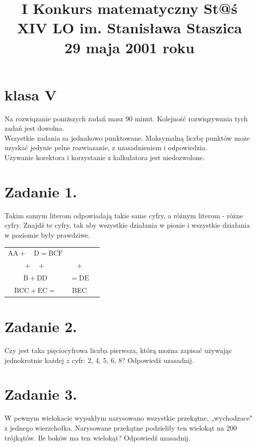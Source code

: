 \documentclass[10pt]{article}
\title{I Konkurs matematyczny St@ś \\
 XIV LO im. Stanisława Staszica \\
 29 maja 2001 roku }
\author{}
\date{}
\begin{document}
\maketitle
\section*{klasa V}
Na rozwiqzanie poniższych zadań masz 90 minut. Kolejność rozwiqzywania tych zadań jest dowolna.\\
Wszystkie zadania sa jednakowo punktowane. Maksymalną liczbę punktów może uzyskać jedynie pelne rozwiazanie, z uzasadnieniem i odpowiedzia.\\
Używanie korektora i korzystanie z kalkulatora jest niedozwolone.

\section*{Zadanie 1.}
Takim samym literom odpowiadają takie same cyfry, a różnym literom - różne cyfry. Znajdź te cyfry, tak aby wszystkie działania w pionie i wszystkie działania w poziomie były prawdziwe.

\begin{center}
\begin{tabular}{ccc}
\(\mathrm{A} \mathrm{A}+\quad \mathrm{D}=\mathrm{BC} \mathrm{F}\) &  \\
\(+\quad+\) & + \\
\(\mathrm{B}+\mathrm{DD}\) & \(=\mathrm{DE}\) \\
\hline
\(\mathrm{BC} \mathrm{C}+\mathrm{EC}=\) & BEC \\
\hline
\end{tabular}
\end{center}

\section*{Zadanie 2.}
Czy jest taka pięciocyfrowa liczba pierwsza, którą można zapisać używając jednokrotnie każdej \(z\) cyfr: 2, 4, 5, 6, 8? Odpowiedź uzasadnij.

\section*{Zadanie 3.}
W pewnym wielokacie wypukłym narysowano wszystkie przekątne, „wychodzace" z jednego wierzchołka. Narysowane przekątne podzieliły ten wielokąt na 200 trójkątów. Ile boków ma ten wielokąt? Odpowiedź uzasadnij.
\end{document}

